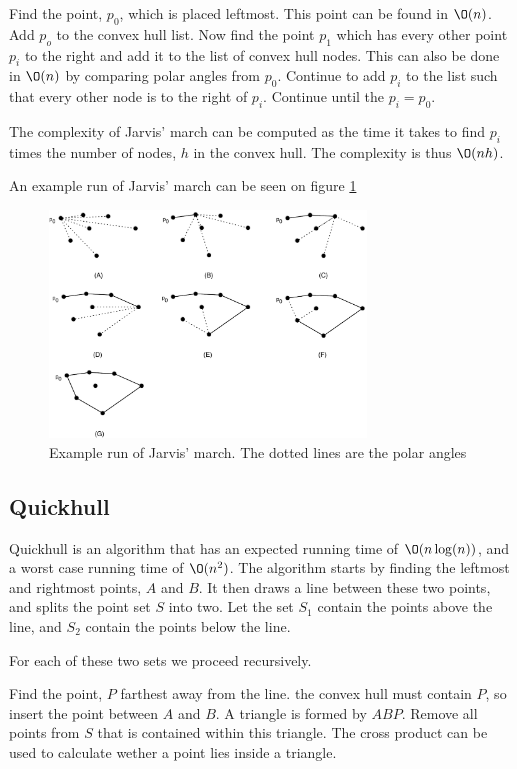 \documentclass[10pt]{article}
\begin{document}
Find the point, $p_0$, which is placed leftmost. This point can be found in $\O(n)$. Add $p_o$ to the convex hull list. Now find the point $p_1$ which has every other point $p_i$ to the right and add it to the list of convex hull nodes. This can also be done in $\O(n)$ by comparing polar angles from $p_0$. Continue to add $p_i$ to the list such that every other node is to the right of $p_i$. Continue until the $p_i=p_0$.

The complexity of Jarvis' march can be computed as the time it takes to find $p_i$ times the number of nodes, $h$ in the convex hull. The complexity is thus $\O(nh)$.

An example run of Jarvis' march can be seen on figure \ref{fig17}

\begin{figure}[ht]
\centering
\includegraphics[width=0.75\textwidth]{figures/fig17.pdf}
\caption{Example run of Jarvis' march. The dotted lines are the polar angles}
\label{fig17}
\end{figure}




\subsection{Quickhull} %
\label{sub:quickhull}
Quickhull is an algorithm that has an expected running time of $\O(n\log(n))$, and a worst case running time of $\O(n^2)$. The algorithm starts by finding the leftmost and rightmost points, $A$ and $B$. It then draws a line between these two points, and splits the point set $S$ into two. Let the set $S_1$ contain the points above the line, and $S_2$ contain the points below the line. 

For each of these two sets we proceed recursively.

Find the point, $P$ farthest away from the line. the convex hull must contain $P$, so insert the point between $A$ and $B$. A triangle is formed by $ABP$. Remove all points from $S$ that is contained within this triangle. The cross product can be used to calculate wether a point lies inside a triangle.                                                                                        
\end{document}
